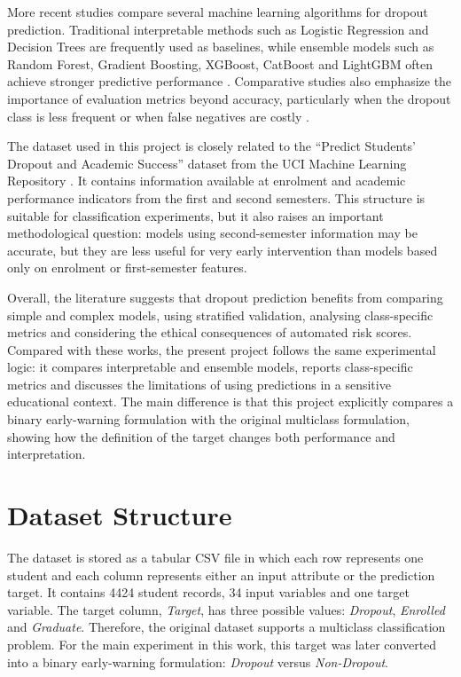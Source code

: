\documentclass[conference]{IEEEtran}
\begin{document}
More recent studies compare several machine learning algorithms for dropout prediction. Traditional interpretable methods such as Logistic Regression and Decision Trees are frequently used as baselines, while ensemble models such as Random Forest, Gradient Boosting, XGBoost, CatBoost and LightGBM often achieve stronger predictive performance \cite{nagy2018predicting,miguéis2018early,lee2023study}. Comparative studies also emphasize the importance of evaluation metrics beyond accuracy, particularly when the dropout class is less frequent or when false negatives are costly \cite{martinho2023supervised}.

The dataset used in this project is closely related to the ``Predict Students' Dropout and Academic Success'' dataset from the UCI Machine Learning Repository \cite{uci2021dropout}. It contains information available at enrolment and academic performance indicators from the first and second semesters. This structure is suitable for classification experiments, but it also raises an important methodological question: models using second-semester information may be accurate, but they are less useful for very early intervention than models based only on enrolment or first-semester features.

Overall, the literature suggests that dropout prediction benefits from comparing simple and complex models, using stratified validation, analysing class-specific metrics and considering the ethical consequences of automated risk scores. Compared with these works, the present project follows the same experimental logic: it compares interpretable and ensemble models, reports class-specific metrics and discusses the limitations of using predictions in a sensitive educational context. The main difference is that this project explicitly compares a binary early-warning formulation with the original multiclass formulation, showing how the definition of the target changes both performance and interpretation.

\section{Dataset Structure}
The dataset is stored as a tabular CSV file in which each row represents one student and each column represents either an input attribute or the prediction target. It contains 4424 student records, 34 input variables and one target variable. The target column, \textit{Target}, has three possible values: \textit{Dropout}, \textit{Enrolled} and \textit{Graduate}. Therefore, the original dataset supports a multiclass classification problem. For the main experiment in this work, this target was later converted into a binary early-warning formulation: \textit{Dropout} versus \textit{Non-Dropout}.
\end{document}
